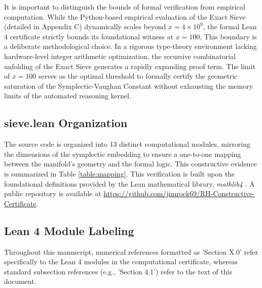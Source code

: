 \documentclass[sn-mathphys-num, pdflatex]{sn-jnl}
\begin{document}
It is important to distinguish the bounds of formal verification from empirical computation. While the Python-based empirical evaluation of the Exact Sieve (detailed in Appendix C) dynamically scales beyond $x = 4 \times 10^9$, the formal Lean 4 certificate strictly bounds its foundational witness at $x=100$. This boundary is a deliberate methodological choice. In a rigorous type-theory environment lacking hardware-level integer arithmetic optimization, the recursive combinatorial unfolding of the Exact Sieve generates a rapidly expanding proof term. The limit of $x=100$ serves as the optimal threshold to formally certify the geometric saturation of the Symplectic-Vaughan Constant without exhausting the memory limits of the automated reasoning kernel.
\subsection{sieve.lean Organization}
The source code is organized into 13 distinct computational modules, mirroring the dimensions of the symplectic embedding to ensure a one-to-one mapping between the manifold's geometry and the formal logic. This constructive evidence is summarized in Table \ref{table:mapping}. This verification is built upon the foundational definitions provided by the Lean mathematical library, \textit{mathlib4} \cite{mathlib2020}. A public repository is available at 
\noindent \url{https://github.com/jimrock69/RH-Constructive-Certificate}. 

\subsection{Lean 4 Module Labeling}
Throughout this manuscript, numerical references formatted as 'Section X.0' refer specifically to the Lean 4 modules in the computational certificate, whereas standard subsection references (e.g., 'Section 4.1') refer to the text of this document.
\end{document}
